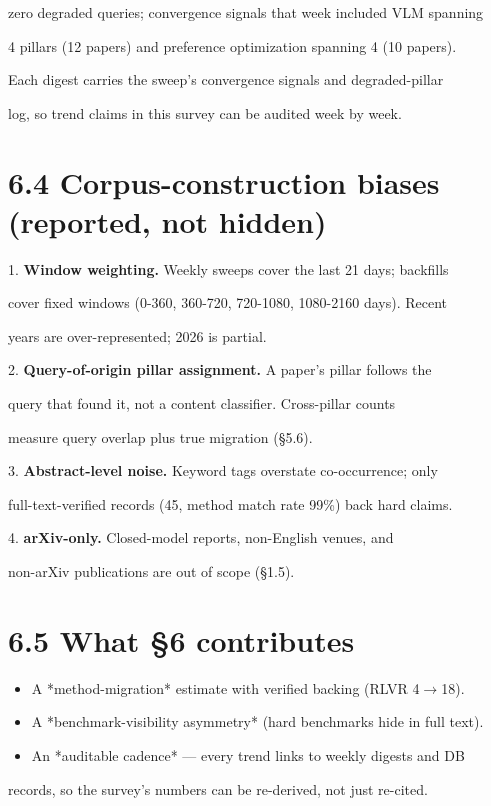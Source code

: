 \documentclass[11pt]{article}
\begin{document}
zero degraded queries; convergence signals that week included VLM spanning

4 pillars (12 papers) and preference optimization spanning 4 (10 papers).

Each digest carries the sweep's convergence signals and degraded-pillar

log, so trend claims in this survey can be audited week by week.


\section{6.4 Corpus-construction biases (reported, not hidden)}

1. \textbf{Window weighting.} Weekly sweeps cover the last 21 days; backfills

cover fixed windows (0-360, 360-720, 720-1080, 1080-2160 days). Recent

years are over-represented; 2026 is partial.

2. \textbf{Query-of-origin pillar assignment.} A paper's pillar follows the

query that found it, not a content classifier. Cross-pillar counts

measure query overlap plus true migration (\S5.6).

3. \textbf{Abstract-level noise.} Keyword tags overstate co-occurrence; only

full-text-verified records (45, method match rate 99\%) back hard claims.

4. \textbf{arXiv-only.} Closed-model reports, non-English venues, and

non-arXiv publications are out of scope (\S1.5).


\section{6.5 What \S6 contributes}

\begin{itemize}
\item A *method-migration* estimate with verified backing (RLVR 4$\rightarrow$18).
\item A *benchmark-visibility asymmetry* (hard benchmarks hide in full text).
\item An *auditable cadence* --- every trend links to weekly digests and DB
\end{itemize}
records, so the survey's numbers can be re-derived, not just re-cited.
\end{document}
